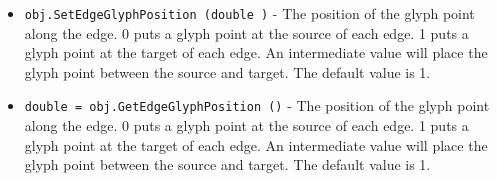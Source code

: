 \begin{itemize}
\item  \verb|obj.SetEdgeGlyphPosition (double )| -  The position of the glyph point along the edge.
 0 puts a glyph point at the source of each edge.
 1 puts a glyph point at the target of each edge.
 An intermediate value will place the glyph point between the source and target.
 The default value is 1.

\item  \verb|double = obj.GetEdgeGlyphPosition ()| -  The position of the glyph point along the edge.
 0 puts a glyph point at the source of each edge.
 1 puts a glyph point at the target of each edge.
 An intermediate value will place the glyph point between the source and target.
 The default value is 1.

\end{itemize}
